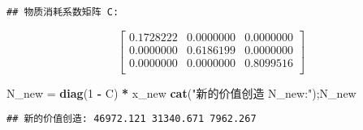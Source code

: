\documentclass[
]{article}
\newenvironment{Shaded}{\begin{snugshade}}{\end{snugshade}}
\newcommand{\DecValTok}[1]{\textcolor[rgb]{0.00,0.00,0.81}{#1}}
\newcommand{\FunctionTok}[1]{\textcolor[rgb]{0.13,0.29,0.53}{\textbf{#1}}}
\newcommand{\NormalTok}[1]{#1}
\newcommand{\OtherTok}[1]{\textcolor[rgb]{0.56,0.35,0.01}{#1}}
\newcommand{\SpecialCharTok}[1]{\textcolor[rgb]{0.81,0.36,0.00}{\textbf{#1}}}
\newcommand{\StringTok}[1]{\textcolor[rgb]{0.31,0.60,0.02}{#1}}
\begin{document}
\begin{verbatim}
## 物质消耗系数矩阵 C:
\end{verbatim}

$$\begin{bmatrix}
0.1728222 & 0.0000000 & 0.0000000 \\
0.0000000 & 0.6186199 & 0.0000000 \\
0.0000000 & 0.0000000 & 0.8099516 \\
\end{bmatrix}$$

\begin{Shaded}
\begin{Highlighting}[]
\NormalTok{N\_new }\OtherTok{=} \FunctionTok{diag}\NormalTok{(}\DecValTok{1} \SpecialCharTok{{-}}\NormalTok{ C) }\SpecialCharTok{*}\NormalTok{ x\_new}
\FunctionTok{cat}\NormalTok{(}\StringTok{"新的价值创造 N\_new:"}\NormalTok{);N\_new}
\end{Highlighting}
\end{Shaded}

\begin{verbatim}
## 新的价值创造: 46972.121 31340.671 7962.267
\end{verbatim}
\end{document}
